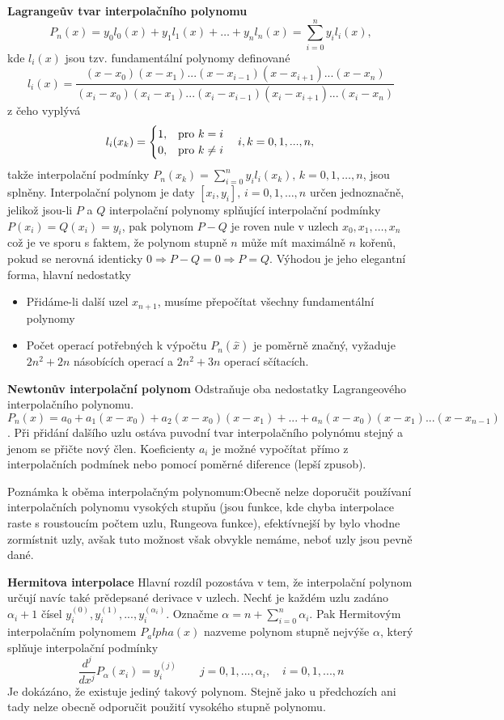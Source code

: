 \textbf{Lagrangeův tvar interpolačního polynomu}
$$P_n(x)=y_0l_0(x)+y_1l_1(x)+\ldots+y_nl_n(x)=\sum_{i=0}^{n}y_il_i(x),$$
kde $l_i(x)$ jsou tzv. fundamentální polynomy definované $$l_i(x)=\frac{(x-x_0)(x-x_1)...(x-x_{i-1})(x-x_{i+1})...(x-x_n)}{(x_i-x_0)(x_i-x_1)...(x_i-x_{i-1})(x_i-x_{i+1})...(x_i-x_n)}$$ z čeho vyplývá
\[
    l_i(x_k)= 
\begin{cases}
        1, & \text{pro } k=i\\
        0, & \text{pro } k\neq i
\end{cases}\quad  i,k=0,1,...,n,\\
\]
takže interpolační podmínky $P_n(x_k)=\sum_{i=0}^n y_il_i(x_k), \, k=0,1,\ldots,n$, jsou splněny. Interpolační polynom je daty $[x_i,y_i],\, i=0,1,\ldots, n$ určen jednoznačně, jelikož jsou-li $P$ a $Q$ interpolační polynomy splňující interpolační podmínky $P(x_i)=Q(x_i)=y_i$, pak polynom $P-Q$ je roven nule v uzlech $x_0,x_1,\ldots,x_n$ což je ve sporu s faktem, že polynom stupně $n$ může mít maximálně $n$ kořenů, pokud se nerovná identicky $0 \Rightarrow P-Q=0 \Rightarrow P=Q$. 
\newline Výhodou je jeho elegantní forma, hlavní nedostatky 
\begin{itemize}
\item Přidáme-li další uzel $x_{n+1}$, musíme přepočítat všechny fundamentální polynomy
\item Počet operací potřebných k výpočtu $P_n(\hat{x}) $ je poměrně značný, vyžaduje $2n^2+2n$ násobících operací a $2n^2+3n$ operací sčítacích.
\end{itemize}


\textbf{Newtonův interpolační polynom}\newline
Odstraňuje oba nedostatky Lagrangeového interpolačního polynomu.$$P_n(x)=a_0+a_1(x-x_0)+a_2(x-x_0)(x-x_1)+...+a_n(x-x_0)(x-x_1)...(x-x_{n-1})$$. Při přidání dalšího uzlu ostáva puvodní tvar interpolačního polynómu stejný a jenom se přičte nový člen. Koeficienty $a_i$ je možné vypočítat přímo z interpolačních podmínek nebo pomocí poměrné diference (lepší zpusob).

Poznámka k oběma interpolačným polynomum:Obecně nelze doporučit používaní interpolačních polynomu vysokých stupňu (jsou funkce, kde chyba interpolace raste s roustoucím počtem uzlu, Rungeova funkce), efektívnejší by bylo vhodne zormístnit uzly, avšak tuto možnost však obvykle nemáme, neboť uzly jsou pevně dané.

\textbf{Hermitova interpolace}\newline
Hlavní rozdíl pozostáva v tem, že interpolační polynom určují navíc také prědepsané derivace v uzlech. 
\newline
Nechť je každém uzlu zadáno $\alpha_i+1$ čísel $y_i^{(0)},y_i^{(1)},...,y_i^{(\alpha_i)}$. Označme $\alpha=n+\sum_{i=0}^n \alpha_i$. Pak Hermitovým interpolačním polynomem $P_alpha(x)$ nazveme polynom stupně nejvýše $\alpha$, který splňuje interpolační podmínky $$\frac{d^j}{dx^j}P_\alpha(x_i)=y_i^{(j)}\qquad j=0,1,...,\alpha_i,\quad i=0,1,...,n$$Je dokázáno, že existuje jediný takový polynom. Stejně jako u předchozích ani tady nelze obecně odporučit použití vysokého stupně polynomu.

